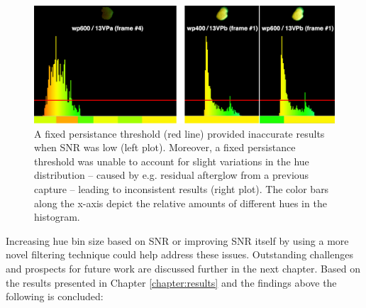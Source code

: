 \documentclass[thesis.tex]{subfiles}
\begin{document}
\begin{figure}[h!]
  \centering \includegraphics[page=1,width=\textwidth]{images/findings/persistance_pitfall}
  \vspace{-8mm}
  \caption{A fixed persistance threshold (red line) provided inaccurate results when SNR was low (left plot). Moreover, a fixed persistance threshold was unable to account for slight variations in the hue distribution -- caused by e.g. residual afterglow from a previous capture -- leading to inconsistent results (right plot). The color bars along the x-axis depict the relative amounts of different hues in the histogram.}
  \label{figure:fingerprint-method-pitfalls}
\end{figure}

Increasing hue bin size based on SNR or improving SNR itself by using a more novel filtering technique could help address these issues. Outstanding challenges and prospects for future work are discussed further in the next chapter. Based on the results presented in Chapter \ref{chapter:results} and the findings above the following is concluded:
\end{document}
